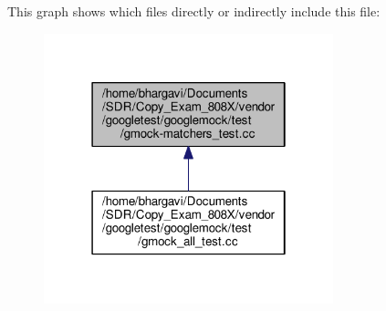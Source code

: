 This graph shows which files directly or indirectly include this file\+:
\nopagebreak
\begin{figure}[H]
\begin{center}
\leavevmode
\includegraphics[width=238pt]{gmock-matchers__test_8cc__dep__incl}
\end{center}
\end{figure}
